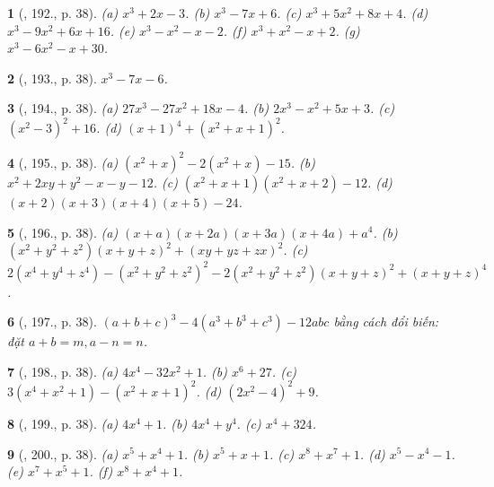 \documentclass{article}
\newtheorem{baitoan}{}
\begin{document}
\begin{baitoan}[\cite{Binh_Toan_8_tap_1}, 192., p. 38]
	(a) $x^3 + 2x - 3$. (b) $x^3 - 7x + 6$. (c) $x^3 + 5x^2 + 8x + 4$. (d) $x^3 - 9x^2 + 6x + 16$. (e) $x^3 - x^2 - x - 2$. (f) $x^3 + x^2 - x + 2$. (g) $x^3 - 6x^2 - x + 30$.
\end{baitoan}

\begin{baitoan}[\cite{Binh_Toan_8_tap_1}, 193., p. 38]
	$x^3 - 7x - 6$.
\end{baitoan}

\begin{baitoan}[\cite{Binh_Toan_8_tap_1}, 194., p. 38]
	(a) $27x^3 - 27x^2 + 18x - 4$. (b) $2x^3 - x^2 + 5x + 3$. (c) $(x^2 - 3)^2 + 16$. (d) $(x + 1)^4 + (x^2 + x + 1)^2$.
\end{baitoan}

\begin{baitoan}[\cite{Binh_Toan_8_tap_1}, 195., p. 38]
	(a) $(x^2 + x)^2 - 2(x^2 + x) - 15$. (b) $x^2 + 2xy + y^2 - x - y - 12$. (c) $(x^2 + x + 1)(x^2 + x + 2) - 12$. (d) $(x + 2)(x + 3)(x + 4)(x + 5) - 24$.
\end{baitoan}

\begin{baitoan}[\cite{Binh_Toan_8_tap_1}, 196., p. 38]
	(a) $(x + a)(x + 2a)(x + 3a)(x + 4a) + a^4$. (b) $(x^2 + y^2 + z^2)(x + y + z)^2 + (xy + yz + zx)^2$. (c) $2(x^4 + y^4 + z^4) - (x^2 + y^2 + z^2)^2 - 2(x^2 + y^2 + z^2)(x + y + z)^2 + (x + y + z)^4$.
\end{baitoan}

\begin{baitoan}[\cite{Binh_Toan_8_tap_1}, 197., p. 38]
	$(a + b + c)^3 - 4(a^3 + b^3 + c^3) - 12abc$ bằng cách đổi biến: đặt $a + b = m,a - n = n$.
\end{baitoan}

\begin{baitoan}[\cite{Binh_Toan_8_tap_1}, 198., p. 38]
	(a) $4x^4 - 32x^2 + 1$. (b) $x^6 + 27$. (c) $3(x^4 + x^2 + 1) - (x^2 + x + 1)^2$. (d) $(2x^2 - 4)^2 + 9$.
\end{baitoan}

\begin{baitoan}[\cite{Binh_Toan_8_tap_1}, 199., p. 38]
	(a) $4x^4 + 1$. (b) $4x^4 + y^4$. (c) $x^4 + 324$.
\end{baitoan}

\begin{baitoan}[\cite{Binh_Toan_8_tap_1}, 200., p. 38]
	(a) $x^5 + x^4 + 1$. (b) $x^5 + x + 1$. (c) $x^8 + x^7 + 1$. (d) $x^5 - x^4 - 1$. (e) $x^7 + x^5 + 1$. (f) $x^8 + x^4 + 1$.
\end{baitoan}
\end{document}
